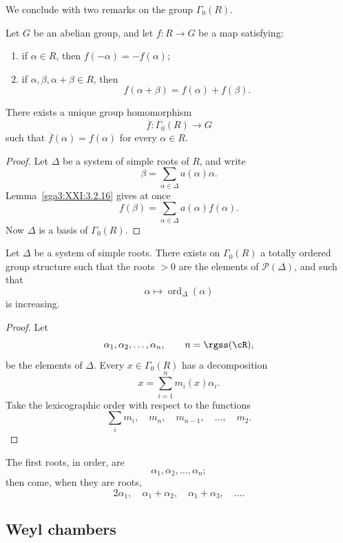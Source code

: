 We conclude with two remarks on the group \(\Gamma_0(R)\).

\begin{proposition}\label{sga3:XXI:3.5.5}
Let \(G\) be an abelian group, and let \(f:R\to G\) be a map
satisfying:
\begin{enumerate}
\item[(i)] if \(\alpha\in R\), then
  \(f(-\alpha)=-f(\alpha)\);
\item[(ii)] if \(\alpha,\beta,\alpha+\beta\in R\), then
  \[
   f(\alpha+\beta)=f(\alpha)+f(\beta).
  \]
\end{enumerate}
There exists a unique group homomorphism
\[
 \overline f:\Gamma_0(R)\longrightarrow G
\]
such that \(\overline f(\alpha)=f(\alpha)\) for every
\(\alpha\in R\).
\end{proposition}

\begin{proof}
Let \(\Delta\) be a system of simple roots of \(R\), and write
\[
 \beta=\sum_{\alpha\in\Delta}a(\alpha)\alpha.
\]
Lemma~\ref{sga3:XXI:3.2.16} gives at once
\[
 f(\beta)=\sum_{\alpha\in\Delta}a(\alpha)f(\alpha).
\]
Now \(\Delta\) is a basis of \(\Gamma_0(R)\).
\end{proof}

\begin{proposition}\label{sga3:XXI:3.5.6}
Let \(\Delta\) be a system of simple roots. There exists on
\(\Gamma_0(R)\) a totally ordered group structure such that the roots
\(>0\) are the elements of \(\mathscr{P}(\Delta)\), and such that
\[
 \alpha\longmapsto\operatorname{ord}_\Delta(\alpha)
\]
is increasing.
\end{proposition}

\begin{proof}
Let
\[
 \alpha_1,\alpha_2,\ldots,\alpha_n,
 \qquad n=\rgss(\cR),
\]
be the elements of \(\Delta\). Every \(x\in\Gamma_0(R)\) has a
decomposition
\[
 x=\sum_{i=1}^{n}m_i(x)\alpha_i.
\]
Take the lexicographic order with respect to the functions
\[
 \sum_i m_i,\quad m_n,\quad m_{n-1},\quad\ldots,\quad m_2.
\]
\end{proof}

\begin{remark}\label{sga3:XXI:3.5.7}
The first roots, in order, are
\[
 \alpha_1,\alpha_2,\ldots,\alpha_n;
\]
then come, when they are roots,
\[
 2\alpha_1,\quad
 \alpha_1+\alpha_2,\quad
 \alpha_1+\alpha_3,\quad\ldots.
\]
\end{remark}

\subsection{Weyl chambers}
\label{sga3:XXI:3.6}

